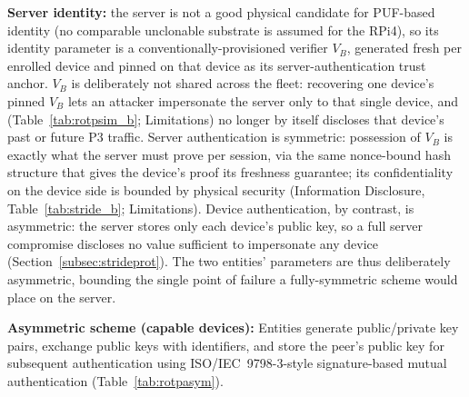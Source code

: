 \documentclass[preprint,12pt,authoryear]{elsarticle}
\begin{document}
\textbf{Server identity:} the server is not a good physical candidate for PUF-based identity (no comparable unclonable substrate is assumed for the RPi4), so its identity parameter is a conventionally-provisioned verifier $V_B$, generated fresh per enrolled device and pinned on that device as its server-authentication trust anchor. $V_B$ is deliberately not shared across the fleet: recovering one device's pinned $V_B$ lets an attacker impersonate the server only to that single device, and (Table~\ref{tab:rotpsim_b}; Limitations) no longer by itself discloses that device's past or future P3 traffic. Server authentication is symmetric: possession of $V_B$ is exactly what the server must prove per session, via the same nonce-bound hash structure that gives the device's proof its freshness guarantee; its confidentiality on the device side is bounded by physical security (Information Disclosure, Table~\ref{tab:stride_b}; Limitations). Device authentication, by contrast, is asymmetric: the server stores only each device's public key, so a full server compromise discloses no value sufficient to impersonate any device (Section~\ref{subsec:strideprot}). The two entities' parameters are thus deliberately asymmetric, bounding the single point of failure a fully-symmetric scheme would place on the server.

\textbf{Asymmetric scheme (capable devices):} Entities generate public/private key pairs, exchange public keys with identifiers, and store the peer's public key for subsequent authentication using ISO/IEC~9798-3-style signature-based mutual authentication \citep{isoiec9798} (Table~\ref{tab:rotpasym}).
\end{document}
